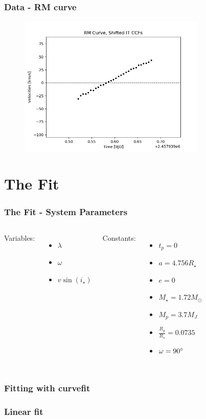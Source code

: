\documentclass[show notes]{beamer}
\begin{document}
\begin{frame}
\frametitle{Data - RM curve}
\begin{figure}
	\centering
	\includegraphics[width=0.8\textwidth]{../figures/RM_shift.png}
	\label{fig:RM_shift}
\end{figure}
\end{frame}

\section*{The Fit}

\begin{frame}
\frametitle{The Fit - System Parameters}
\begin{columns}
	Variables:
	\begin{itemize}
	\item $\lambda$
	\item $\omega$
	\item $v \sin(i_\star)$
	\end{itemize}
	Constants:
	\begin{itemize}
	\item $t_p = 0$
	\item $a = 4.756 R_\star$
	\item $e = 0$
	\item $M_\star = 1.72 M_\odot$
	\item $M_p = 3.7 M_J$
	\item $\frac{R_p}{R_\star} = 0.0735$
	\item $\omega = 90 \degree$
	\end{itemize}
\end{columns}
\end{frame}

\begin{frame}
\frametitle{Fitting with curvefit}

\end{frame}

\begin{frame}
\frametitle{Linear fit}
\end{frame}
\end{document}
